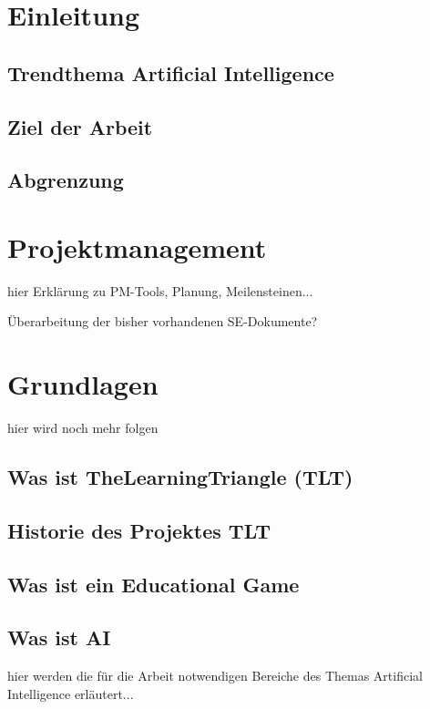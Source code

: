 \section{Einleitung}

\subsection{Trendthema Artificial Intelligence}

\subsection{Ziel der Arbeit}

\subsection{Abgrenzung}

\section{Projektmanagement}

hier Erklärung zu PM-Tools, Planung, Meilensteinen...

Überarbeitung der bisher vorhandenen SE-Dokumente?

\section{Grundlagen}

hier wird noch mehr folgen

\subsection{Was ist TheLearningTriangle (TLT)}

\subsection{Historie des Projektes TLT}

\subsection{Was ist ein Educational Game}

\subsection{Was ist AI}

hier werden die für die Arbeit notwendigen Bereiche des Themas Artificial Intelligence erläutert...

